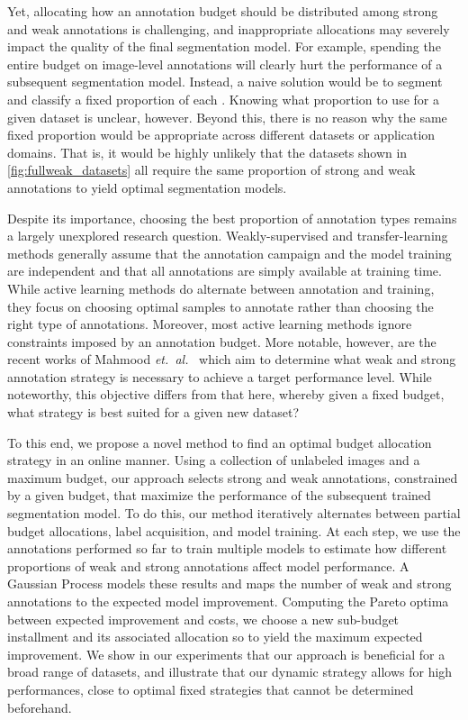 Yet, allocating how an annotation budget should be distributed among strong and weak annotations is challenging, and inappropriate allocations may severely impact the quality of the final segmentation model. For example, spending the entire budget on image-level annotations will clearly hurt the performance of a subsequent segmentation model. Instead, a naive solution would be to segment and classify a fixed proportion of each . Knowing what proportion to use for a given dataset is unclear, however. Beyond this, there is no reason why the same fixed proportion would be appropriate across different datasets or application domains. That is, it would be highly unlikely that the datasets shown in \cref{fig:fullweak_datasets} all require the same proportion of strong and weak annotations to yield optimal segmentation models.

Despite its importance, choosing the best proportion of annotation types remains a largely unexplored research question. Weakly-supervised and transfer-learning methods generally assume that the annotation campaign and the model training are independent and that all annotations are simply available at training time. While active learning methods do alternate between annotation and training, they focus on choosing optimal samples to annotate rather than choosing the right type of annotations. Moreover, most active learning methods ignore constraints imposed by an annotation budget. More notable, however, are the recent works of Mahmood {\it et.~al.}~ which aim to determine what weak and strong annotation strategy is necessary to achieve a target performance level. While noteworthy, this objective differs from that here, whereby given a fixed budget, what strategy is best suited for a given new dataset?

To this end, we propose a novel method to find an optimal budget allocation strategy in an online manner. Using a collection of unlabeled images and a maximum budget, our approach selects strong and weak annotations, constrained by a given budget, that maximize the performance of the subsequent trained segmentation model. To do this, our method iteratively alternates between partial budget allocations, label acquisition, and model training. At each step, we use the annotations performed so far to train multiple models to estimate how different proportions of weak and strong annotations affect model performance. A Gaussian Process models these results and maps the number of weak and strong annotations to the expected model improvement. Computing the Pareto optima between expected improvement and costs, we choose a new sub-budget installment and its associated allocation so to yield the maximum expected improvement. We show in our experiments that our approach is beneficial for a broad range of datasets, and illustrate that our dynamic strategy allows for high performances, close to optimal fixed strategies that cannot be determined beforehand.
